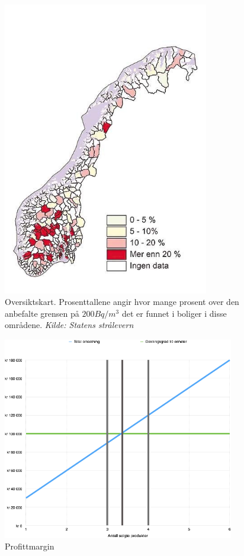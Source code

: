 \begin{figure}[ht!]
\centering
\includegraphics[width=90mm]{straleskart.jpg}
\caption{Oversiktskart. Prosenttallene angir hvor mange prosent over den anbefalte grensen på $200Bq/m^3$ det er funnet i boliger i disse områdene.
\textit{Kilde: Statens strålevern}
}
\label{fig:oversiktskart}
\end{figure}

\begin{figure}[ht!]
    \begin{center}
    \includegraphics[width=0.9\textwidth]{graph.png}
    \caption{Profittmargin}
    \label{fig:profitmargin}
    \end{center}
\end{figure}

